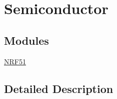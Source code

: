 \hypertarget{group___nordic}{}\section{Semiconductor}
\label{group___nordic}
\subsection*{Modules}
\begin{DoxyCompactItemize}
\item 
\hyperlink{group__n_r_f51}{N\+R\+F51}
\end{DoxyCompactItemize}


\subsection{Detailed Description}
